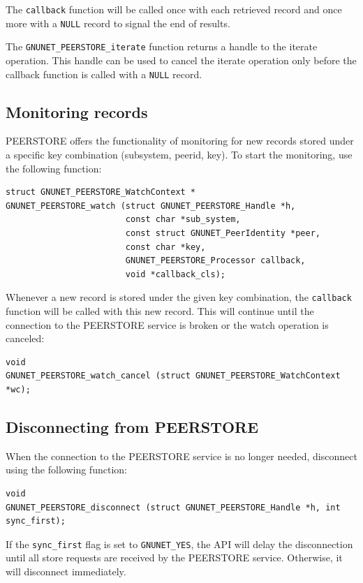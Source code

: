 \documentclass[10pt]{article}
\begin{document}
The \lstinline|callback| function will be called once with each retrieved record and once
more with a \lstinline|NULL| record to signal the end of results.

The \lstinline|GNUNET_PEERSTORE_iterate| function returns a handle to the iterate operation. This
handle can be used to cancel the iterate operation only before the callback function is called with
a \lstinline|NULL| record.

\subsection{Monitoring records}

PEERSTORE offers the functionality of monitoring for new records stored under a specific key
combination (subsystem, peerid, key). To start the monitoring, use the following function:
\begin{lstlisting}
struct GNUNET_PEERSTORE_WatchContext *
GNUNET_PEERSTORE_watch (struct GNUNET_PEERSTORE_Handle *h,
                        const char *sub_system,
                        const struct GNUNET_PeerIdentity *peer,
                        const char *key,
                        GNUNET_PEERSTORE_Processor callback,
                        void *callback_cls);
\end{lstlisting}

Whenever a new record is stored under the given key combination, the \lstinline|callback| function
will be called with this new record. This will continue until the connection to the PEERSTORE service
is broken or the watch operation is canceled:
\begin{lstlisting}
void
GNUNET_PEERSTORE_watch_cancel (struct GNUNET_PEERSTORE_WatchContext *wc);
\end{lstlisting}

\subsection{Disconnecting from PEERSTORE}

When the connection to the PEERSTORE service is no longer needed, disconnect using the following
function:
\begin{lstlisting}
void
GNUNET_PEERSTORE_disconnect (struct GNUNET_PEERSTORE_Handle *h, int sync_first);
\end{lstlisting}

If the \lstinline|sync_first| flag is set to \lstinline|GNUNET_YES|, the API will delay the
disconnection until all store requests are received by the PEERSTORE service. Otherwise,
it will disconnect immediately.
\end{document}
